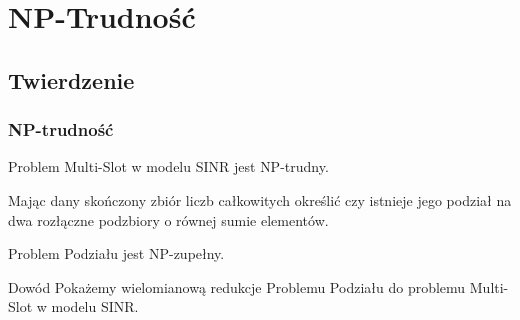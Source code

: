 \documentclass[polish, t,10pt]{beamer}
\begin{document}
\section{NP-Trudność}
\subsection{Twierdzenie}
\begin{frame}
    \frametitle{NP-trudność}
    \begin{theorem}
        Problem Multi-Slot w modelu SINR jest NP-trudny.
    \end{theorem}
    \begin{definition}
        Mając dany skończony zbiór liczb całkowitych określić czy istnieje jego podział na dwa rozłączne podzbiory o równej sumie elementów.
    \end{definition}
    \begin{fact}
        Problem Podziału jest NP-zupełny.
    \end{fact}
    \begin{block}{Dowód}
        Pokażemy wielomianową redukcje Problemu Podziału do problemu Multi-Slot w modelu SINR.
    \end{block}
\end{frame}
\end{document}
